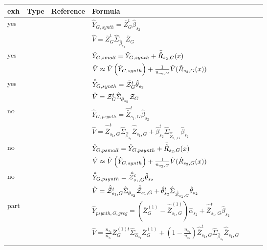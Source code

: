 \begin{table}
    \centering
\begin{tabular}{l l l l l r l}
	 exh 	&  Type	&  Reference & Formula\\ \toprule
			
     yes 	&  \psynthetic{} 	& \cite[eq. 18]{Man13a} & $\hat{Y}_{G,synth} = \bar{Z}^t_G\hat{\beta}_{s_2}$ \\
        &    	& \cite[eq. 19]{Man13a} & $\hat{V} = \bar{Z}^t_G \hat{\Sigma}_{ \hat{\beta}_{s_2}} \bar{Z}_G$ \\
			
\lightrule
yes 	&  \psmall{} 	& \cite[eq. 20]{Man13a} & $\hat{Y}_{G,small} = \hat{Y}_{G,synth} +\bar{\hat{R}}_{s_2,G}(x)$ \\
            &   	& \cite[eq. 21]{Man13a} & $\hat{V} \approx \hat{V}\left(\hat{Y}_{G,synth}\right) + \frac{1}{n_{s_2,G}}\hat{V}(\hat{R}_{s_2,G}(x)) $ \\ 
\lightrule
yes 	&  \pextended{} 	& \cite[eq. 31]{Man13a} & $\hat{\tilde{Y}}_{G,synth} = \bar{\mathcal{Z}}^t_G\hat{\theta}_{s_2}$ \\
    &    	& \cite[eq. 33]{Man13a} & $\hat{V} = \bar{\mathcal{Z}}^t_G \hat{\Sigma}_{ \hat{\theta}_{s_2}} \bar{\mathcal{Z}}_G$ \\
\strongrule
			

no 	&  \psynthetic{} 	& \cite[eq. 22]{Man13a} & $\hat{Y}_{G,psynth} = \hat{\bar{Z}}^t_{s_1,G}\hat{\beta}_{s_2}$ \\
        &    	& \cite[eq. 23]{Man13a} & $\hat{V} = \hat{\bar{Z}}^t_{s_1,G} \hat{\Sigma}_{ \hat{\beta}_{s_2}} \hat{\bar{Z}}_{s_1,G} + \hat{\beta}^t_{s_2} \hat{\Sigma}_{ \hat{\bar{Z}}_{s_1,G}  } \hat{\beta}_{s_2}$ \\
			
\lightrule
no 	&  \psmall{} 	& \cite[eq. 25]{Man13a} & $\hat{Y}_{G,psmall} = \hat{Y}_{G,psynth} + \bar{\hat{R}}_{s_2,G}(x)$ \\
            &      	& \cite[eq. 26]{Man13a} & $\hat{V} \approx \hat{V}\left(\hat{Y}_{G,synth}\right) + \frac{1}{n_{s_2,G}}\hat{V}(\hat{R}_{s_2,G}(x))$ \\
\lightrule
no 	&  \pextended{} 	& \cite[eq. 35]{Man13a} & $\hat{\tilde{Y}}_{G,psynth} = \hat{\bar{\mathcal{Z}}}^t_{s_1,G}\hat{\theta}_{s_2}$ \\
    &    	&  \cite[eq. 36]{Man13a} & $\hat{V} = \hat{\bar{\mathcal{Z}}}^t_{s_1,G} \hat{\Sigma}_{ \hat{\theta}_{s_2}} \hat{\bar{\mathcal{Z}}}_{s_1,G} + \hat{\theta}^t_{s_2} \hat{\Sigma}_{ \hat{\bar{\mathcal{Z}}}_{s_1,G}  } \hat{\theta}_{s_2}$ \\
			
\strongrule
			
part 	&  \psynthetic{} 	& \cite[eq. 34]{Man13b} & $\hat{Y}_{psynth,G,greg} = \left( \bar{Z}_G^{(1)}- \hat{\bar{Z}}_{s_1,G}^{(1)}\right) \hat{\alpha}_{s_2} + \hat{\bar{Z}}^t_{s_1,G}\hat{\beta}_{s_2}$\\
        &    	&     \cite[eq. 35]{Man13b} & $\hat{V} = \frac{n_{s_2}}{n_{s_1}}\bar{Z}^{(1)t}_G \hat{\Sigma}_{ \hat{\alpha}_{s_2}} \bar{Z}^{(1)}_G + (1-\frac{n_{s_2}}{n_{s_1}})\hat{\bar{Z}}^{t}_{s_1,G} \hat{\Sigma}_{ \hat{\beta}_{s_2}} \hat{\bar{Z}}_{s_1,G} $ \\
\lightrule
			

\end{tabular}
\end{table}
